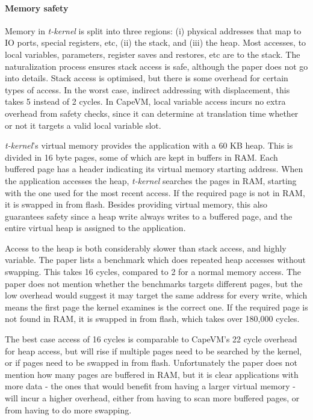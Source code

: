 \paragraph{Memory safety}
Memory in \emph{t-kernel} is split into three regions: (i) physical addresses that map to IO ports, special registers, etc, (ii) the stack, and (iii) the heap. Most accesses, to local variables, parameters, register saves and restores, etc are to the stack. The naturalization process ensures stack access is safe, although the paper does not go into details. Stack access is optimised, but there is some overhead for certain types of access. In the worst case, indirect addressing with displacement, this takes 5 instead of 2 cycles. In CapeVM, local variable access incurs no extra overhead from safety checks, since it can determine at translation time whether or not it targets a valid local variable slot.

\emph{t-kernel}'s virtual memory provides the application with a 60 KB heap. This is divided in 16 byte pages, some of which are kept in buffers in RAM. Each buffered page has a header indicating its virtual memory starting address. When the application accesses the heap, \emph{t-kernel} searches the pages in RAM, starting with the one used for the most recent access. If the required page is not in RAM, it is swapped in from flash. Besides providing virtual memory, this also guarantees safety since a heap write always writes to a buffered page, and the entire virtual heap is assigned to the application.

Access to the heap is both considerably slower than stack access, and highly variable. The paper lists a benchmark which does repeated heap accesses without swapping. This takes 16 cycles, compared to 2 for a normal memory access. The paper does not mention whether the benchmarks targets different pages, but the low overhead would suggest it may target the same address for every write, which means the first page the kernel examines is the correct one. If the required page is not found in RAM, it is swapped in from flash, which takes over 180,000 cycles.

The best case access of 16 cycles is comparable to CapeVM's 22 cycle overhead for heap access, but will rise if multiple pages need to be searched by the kernel, or if pages need to be swapped in from flash. Unfortunately the paper does not mention how many pages are buffered in RAM, but it is clear applications with more data - the ones that would benefit from having a larger virtual memory - will incur a higher overhead, either from having to scan more buffered pages, or from having to do more swapping.

